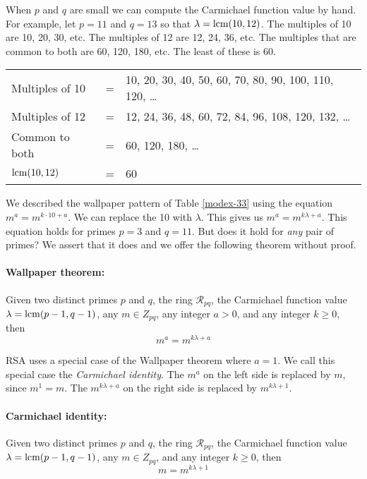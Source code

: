 When $p$ and $q$ are small we can compute the Carmichael function value by hand.
For example, let $p=11$ and $q=13$ so that $\lambda=\mathrm{lcm}(10,12)$.
The multiples of 10 are 10, 20, 30, etc.
The multiples of 12 are 12, 24, 36, etc.
The multiples that are common to both are 60, 120, 180, etc.
The least of these is 60.
\begin{center}
\begin{tabular}{lcl}
  Multiples of 10 &=& 10, 20, 30, 40, 50, 60, 70, 80, 90, 100, 110, 120, \ldots \\
  Multiples of 12 &=& 12, 24, 36, 48, 60, 72, 84, 96, 108, 120, 132, \ldots \\
  Common to both &=& 60, 120, 180, \ldots \\
  $\mathrm{lcm}(10,12)$ &=& 60
\end{tabular}
\end{center}

We described the wallpaper pattern of Table \ref{modex-33} 
using the equation $m^a=m^{k \cdot 10 + a}$.  We can replace the 10 with $\lambda$.
This gives us $m^a=m^{k\lambda + a}$.
This equation holds for primes $p=3$ and $q=11$.
But does it hold for \emph{any} pair of primes?
We assert that it does and we offer the following theorem without proof.

\paragraph{Wallpaper theorem:}
Given two distinct primes $p$ and $q$, the ring $\mathcal{R}_{pq}$,
the Carmichael function value $\lambda=\mathrm{lcm}(p-1,q-1)$, 
any $m \in Z_{pq}$, any integer $a > 0$, and any integer $k \ge 0$, then
\[  m^a = m^{k\lambda + a}  \]

RSA uses a special case of the Wallpaper theorem where $a=1$.
We call this special case the \emph{Carmichael identity}.
The $m^a$ on the left side is replaced by $m$, since $m^1=m$.
The $m^{k\lambda + a}$ on the right side is replaced by $m^{k\lambda + 1}$.

\paragraph{Carmichael identity:}
Given two distinct primes $p$ and $q$, the ring $\mathcal{R}_{pq}$,
the Carmichael function value $\lambda=\mathrm{lcm}(p-1,q-1)$, 
any $m \in Z_{pq}$, and any integer $k \ge 0$, then
\begin{equation} \label{eq:carm-id}
  m = m^{k\lambda + 1}
\end{equation}

